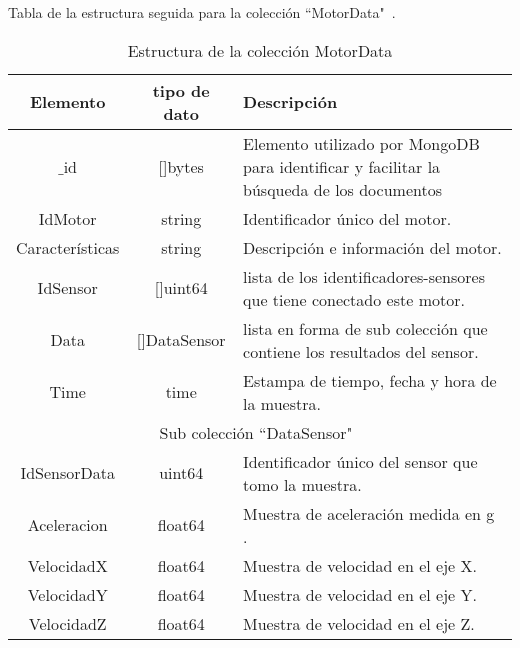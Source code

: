     \begin{table}[ht]
        \begin{center}
            Tabla de la estructura seguida para la colección ``MotorData"\ .\\

            \vspace{0.3cm}
            \begin{tabular}{|c|c|p{9cm}|}
                \hline
                Elemento        & tipo de dato & Descripción \\\hline\hline
                $\_$id      & []bytes  & Elemento utilizado por MongoDB para
                identificar y facilitar la búsqueda de los documentos\\\hline
                IdMotor         & string   & Identificador único del motor.\\\hline
                Características & string   & Descripción e información del motor.\\\hline
                IdSensor        & []uint64 & lista de los identificadores-sensores
                que tiene conectado este motor.\\\hline
                Data            & []DataSensor & lista en forma de sub colección
                que contiene los resultados del sensor.\\\hline
                Time            & time  & Estampa de tiempo, fecha y hora de la muestra.\\\hline
                \hline
                \multicolumn{3}{|c|}{Sub colección  ``DataSensor"\ }\\\hline\hline
                IdSensorData & uint64 & Identificador único del sensor que tomo la muestra.\\\hline
                Aceleracion  & float64 & Muestra de aceleración medida en g .\\\hline
                VelocidadX & float64 & Muestra de velocidad en el eje X.\\\hline
                VelocidadY & float64 & Muestra de velocidad en el eje Y.\\\hline
                VelocidadZ & float64 & Muestra de velocidad en el eje Z.\\
                \hline
            \end{tabular}
        \end{center}
        \caption[Estructura de MotorData]{Estructura de la colección MotorData}
        \label{tab:MotorDatabson}
    \end{table}

